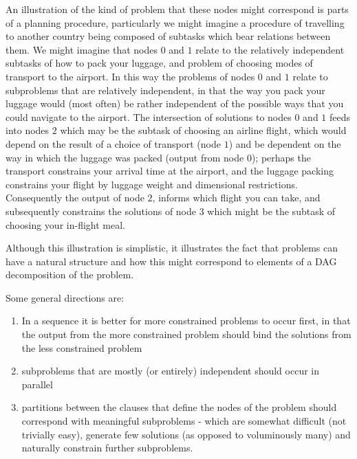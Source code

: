 \documentclass[
10pt, %
a4paper, %
oneside, %
headinclude,footinclude, %
BCOR5mm, %
]{scrartcl}
\begin{document}
An illustration of the kind of problem that these nodes might correspond is parts of a planning procedure, particularly we might imagine a procedure of travelling to another country being
composed of subtasks which bear relations between them.
We might imagine that nodes $0$ and $1$ relate to the relatively independent subtasks of how to pack your luggage, and problem of choosing modes of transport to the airport.
In this way the problems of nodes $0$ and $1$ relate to subproblems that are relatively independent, in that the way you pack your luggage would (most often) be rather independent of the possible
ways that you could navigate to the airport.
The intersection of solutions to nodes $0$ and $1$ feeds into nodes $2$ which may be the subtask of choosing an airline flight, which would depend on the result of a choice of transport (node $1$) and
be dependent on the way in which the luggage was packed (output from node $0$); perhaps the transport constrains your arrival time at the airport, and the luggage packing constrains your flight by
luggage weight and dimensional restrictions.
Consequently the output of node $2$, informs which flight you can take, and subsequently constrains the solutions of node $3$ which might be the subtask of choosing your in-flight meal.

Although this illustration is simplistic, it illustrates the fact that problems can have a natural structure and how this might correspond to elements of a DAG decomposition of the problem.

Some general directions are:
\begin{enumerate}
\item	In a sequence it is better for more constrained problems to occur first, in that the output from the more constrained problem should bind the solutions from the less constrained problem
\item	subproblems that are mostly (or entirely) independent should occur in parallel
\item	partitions between the clauses that define the nodes of the problem should correspond with meaningful subproblems - 
which are somewhat difficult (not trivially easy), generate few solutions (as opposed to voluminously many) and naturally constrain further subproblems.
\end{enumerate}
\end{document}
